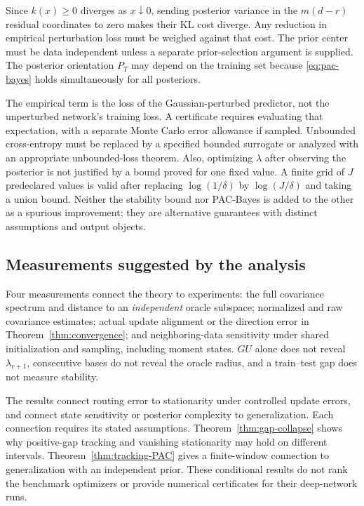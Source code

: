 Since $k(x)\ge0$ diverges as $x\downarrow0$, sending posterior variance
in the $m(d-r)$ residual coordinates to zero makes their KL cost diverge.
Any reduction in empirical perturbation loss must be weighed against that cost. The
prior center must be data independent unless a separate prior-selection
argument is supplied. The posterior orientation $P_T$ may depend on the
training set because \eqref{eq:pac-bayes} holds simultaneously for all
posteriors.

The empirical term is the loss of the Gaussian-perturbed predictor, not
the unperturbed network's training loss. A certificate requires evaluating
that expectation, with a separate Monte Carlo error allowance if sampled.
Unbounded cross-entropy must be replaced by a specified bounded surrogate
or analyzed with an appropriate unbounded-loss theorem. Also, optimizing
$\lambda$ after observing the posterior is not justified by a bound proved
for one fixed value. A finite grid of $J$ predeclared values is valid after
replacing $\log(1/\delta)$ by $\log(J/\delta)$ and taking a union bound.
Neither the stability bound nor PAC-Bayes is added to the other as a
spurious improvement; they are alternative guarantees with distinct
assumptions and output objects.

\subsection{Measurements suggested by the analysis}

Four measurements connect the theory to experiments: the full covariance
spectrum and distance to an \emph{independent} oracle subspace; normalized
and raw covariance estimates; actual update alignment or the direction
error in Theorem~\ref{thm:convergence}; and neighboring-data sensitivity
under shared initialization and sampling, including moment states.
$GU$ alone does not reveal $\lambda_{r+1}$, consecutive bases do not
reveal the oracle radius, and a train--test gap does not measure stability.

The results connect routing error to stationarity under controlled update
errors, and connect state sensitivity or posterior complexity to
generalization. Each connection requires its stated assumptions.
Theorem~\ref{thm:gap-collapse} shows why positive-gap tracking and
vanishing stationarity may hold on different intervals.
Theorem~\ref{thm:tracking-PAC} gives a finite-window connection to
generalization with an independent prior. These conditional results do
not rank the benchmark optimizers or provide numerical certificates for
their deep-network runs.
